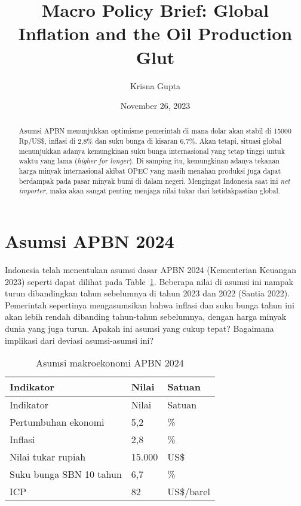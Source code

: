 \documentclass[
  a4paper,
  DIV=11,
  numbers=noendperiod]{scrreprt}
\title{Macro Policy Brief: Global Inflation and the Oil Production Glut}
\author{Krisna Gupta}
\date{November 26, 2023}
\begin{document}
\maketitle
\begin{abstract}
Asumsi APBN menunjukkan optimisme pemerintah di mana dolar akan stabil
di 15000 Rp/US\$, inflasi di 2,8\% dan suku bunga di kisaran 6,7\%. Akan
tetapi, situasi global menunjukkan adanya kemungkinan suku bunga
internasional yang tetap tinggi untuk waktu yang lama (\emph{higher for
longer}). Di samping itu, kemungkinan adanya tekanan harga minyak
internasional akibat OPEC yang masih menahan produksi juga dapat
berdampak pada pasar minyak bumi di dalam negeri. Mengingat Indonesia
saat ini \emph{net importer}, maka akan sangat penting menjaga nilai
tukar dari ketidakpastian global.
\end{abstract}
\ifdefined\Shaded\renewenvironment{Shaded}{\begin{tcolorbox}[borderline west={3pt}{0pt}{shadecolor}, frame hidden, boxrule=0pt, breakable, interior hidden, sharp corners, enhanced]}{\end{tcolorbox}}\fi

\hypertarget{asumsi-apbn-2024}{%
\section{Asumsi APBN 2024}\label{asumsi-apbn-2024}}

Indonesia telah menentukan asumsi dasar APBN 2024 (Kementerian Keuangan
2023) seperti dapat dilihat pada Table~\ref{tbl-1}. Beberapa nilai di
asumsi ini nampak turun dibandingkan tahun sebelumnya di tahun 2023 dan
2022 (Santia 2022). Pemerintah sepertinya mengasumsikan bahwa inflasi
dan suku bunga tahun ini akan lebih rendah dibanding tahun-tahun
sebelumnya, dengan harga minyak dunia yang juga turun. Apakah ini asumsi
yang cukup tepat? Bagaimana implikasi dari deviasi asumsi-asumsi ini?

\hypertarget{tbl-1}{}
\begin{longtable}[]{@{}lll@{}}
\caption{\label{tbl-1}Asumsi makroekonomi APBN 2024}\tabularnewline
\toprule\noalign{}
Indikator & Nilai & Satuan \\
\midrule\noalign{}
\endfirsthead
\toprule\noalign{}
Indikator & Nilai & Satuan \\
\midrule\noalign{}
\endhead
\bottomrule\noalign{}
\endlastfoot
Pertumbuhan ekonomi & 5,2 & \% \\
Inflasi & 2,8 & \% \\
Nilai tukar rupiah & 15.000 & US\$ \\
Suku bunga SBN 10 tahun & 6,7 & \% \\
ICP & 82 & US\$/barel \\
\end{longtable}
\end{document}

